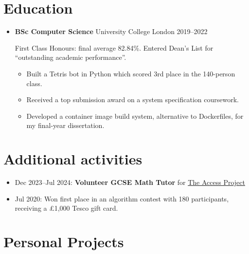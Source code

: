   \section{Education}

  \begin{itemize}
    \item \textbf{BSc Computer Science} \dashdiv{} University College London \dashdiv{} 2019--2022

      First Class Honours: final average 82.84\%. Entered Dean's List for ``outstanding academic performance''.

      \begin{itemize}
        \item Built a Tetris bot in Python which scored 3rd place in the 140-person class.
        \item Received a top submission award on a system specification coursework.
        \item Developed a container image build system, alternative to Dockerfiles, for my final-year dissertation.
      \end{itemize}
  \end{itemize}

  \section{Additional activities}

  \begin{itemize}
    \item Dec 2023--Jul 2024: \textbf{Volunteer GCSE Math Tutor} for \href{https://www.theaccessproject.org.uk}{\color{link}The Access Project}
    \item Jul 2020: Won first place in an algorithm contest with 180 participants, receiving a £1,000 Tesco gift card.
  \end{itemize}

  \section{Personal Projects}


